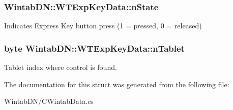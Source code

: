 \hypertarget{struct_wintab_d_n_1_1_w_t_exp_key_data_a2be90aaa315c0aa994448b83fb0136f9}{
\subsubsection[{nState}]{ {\bf WintabDN::WTExpKeyData::nState}}}
\label{struct_wintab_d_n_1_1_w_t_exp_key_data_a2be90aaa315c0aa994448b83fb0136f9}


Indicates Express Key button press (1 = pressed, 0 = released) 

\hypertarget{struct_wintab_d_n_1_1_w_t_exp_key_data_ae3e24d2799a9ea087dd008a29f298b10}{
\subsubsection[{nTablet}]{\setlength{\rightskip}{0pt plus 5cm}byte {\bf WintabDN::WTExpKeyData::nTablet}}}
\label{struct_wintab_d_n_1_1_w_t_exp_key_data_ae3e24d2799a9ea087dd008a29f298b10}


Tablet index where control is found. 



The documentation for this struct was generated from the following file:\begin{DoxyCompactItemize}
\item 
WintabDN/CWintabData.cs\end{DoxyCompactItemize}
